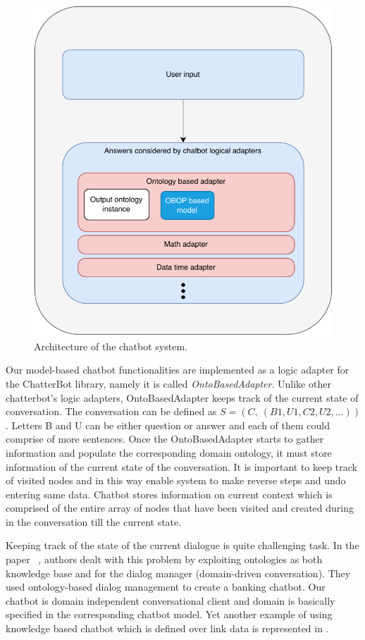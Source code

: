 \documentclass[runningheads]{llncs}
\begin{document}
\begin{figure}[H]
  \centering
  \includegraphics[width=0.5\linewidth]{img/architecture}
  \caption{Architecture of the chatbot system.}
  \label{fig:architecture}
\end{figure}



Our model-based chatbot functionalities are implemented as a logic adapter for the ChatterBot library, namely it is called \textit{OntoBasedAdapter}. Unlike other chatterbot's logic adapters, OntoBasedAdapter keeps track of the current state of conversation. The conversation can be defined as $S=(C,\ (B1,U1,C2,U2,\dots))$. Letters B and U can be either question or answer and each of them could comprise of more sentences. Once the OntoBasedAdapter starts to gather information and populate the corresponding domain ontology, it must store information of the current state of the conversation. It is important to keep track of visited nodes and in this way enable system to make reverse steps and undo entering same data. Chatbot stores information on current context which is comprised of the entire array of nodes that have been visited and created during in the conversation till the current state. 

Keeping track of the state of the current dialogue is quite challenging task. 
In the paper ~\cite{altinok2018ontology}, authors dealt with this problem by exploiting ontologies as both knowledge base and for the dialog manager (domain-driven conversation). They used ontology-based dialog management to create a banking chatbot. Our chatbot is domain independent conversational client and domain is basically specified in the corresponding chatbot model. Yet another example of using knowledge based chatbot which is defined over link data is represented in \cite{ait2020kbot}.
\end{document}
